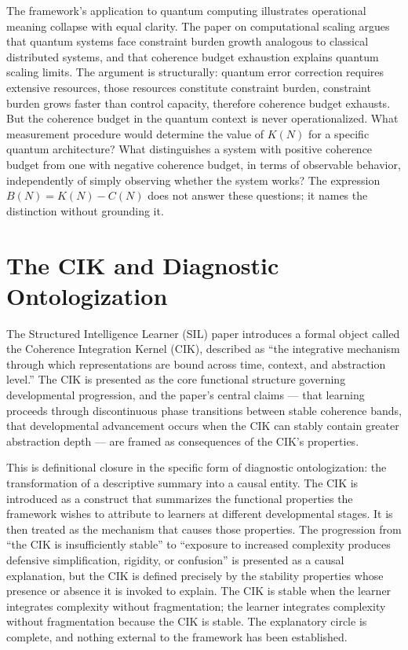 \documentclass[12pt, openright, twoside]{book}
\begin{document}
The framework's application to quantum computing illustrates operational meaning
collapse with equal clarity. The paper on computational scaling argues that
quantum systems face constraint burden growth analogous to classical distributed
systems, and that coherence budget exhaustion explains quantum scaling limits.
The argument is structurally: quantum error correction requires extensive resources,
those resources constitute constraint burden, constraint burden grows faster than
control capacity, therefore coherence budget exhausts. But the coherence budget
in the quantum context is never operationalized. What measurement procedure would
determine the value of $K(N)$ for a specific quantum architecture? What
distinguishes a system with positive coherence budget from one with negative
coherence budget, in terms of observable behavior, independently of simply
observing whether the system works? The expression $B(N) = K(N) - C(N)$ does
not answer these questions; it names the distinction without grounding it.

\section{The CIK and Diagnostic Ontologization}

The Structured Intelligence Learner (SIL) paper introduces a formal object
called the Coherence Integration Kernel (CIK), described as ``the integrative
mechanism through which representations are bound across time, context, and
abstraction level.'' The CIK is presented as the core functional structure
governing developmental progression, and the paper's central claims --- that
learning proceeds through discontinuous phase transitions between stable
coherence bands, that developmental advancement occurs when the CIK can
stably contain greater abstraction depth --- are framed as consequences of the
CIK's properties.

This is definitional closure in the specific form of diagnostic ontologization:
the transformation of a descriptive summary into a causal entity. The CIK is
introduced as a construct that summarizes the functional properties the framework
wishes to attribute to learners at different developmental stages. It is then
treated as the mechanism that causes those properties. The progression from
``the CIK is insufficiently stable'' to ``exposure to increased complexity
produces defensive simplification, rigidity, or confusion'' is presented as
a causal explanation, but the CIK is defined precisely by the stability
properties whose presence or absence it is invoked to explain. The CIK is stable
when the learner integrates complexity without fragmentation; the learner integrates
complexity without fragmentation because the CIK is stable. The explanatory
circle is complete, and nothing external to the framework has been established.
\end{document}
